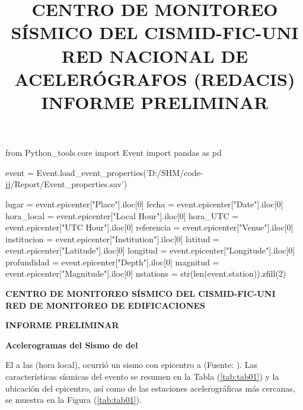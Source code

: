 \documentclass[11pt, a4paper]{report}
\title{CENTRO DE MONITOREO SÍSMICO DEL CISMID-FIC-UNI \\
RED NACIONAL DE ACELERÓGRAFOS (REDACIS)\\
INFORME PRELIMINAR\\
}
\begin{document}




\begin{pycode}
from Python_tools.core import Event
import pandas as pd

event = Event.load_event_properties('D:/SHM/code-jj/Report/Event_properties.sav')

lugar = event.epicenter["Place"].iloc[0]
fecha = event.epicenter["Date"].iloc[0]
hora_local = event.epicenter["Local Hour"].iloc[0]
hora_UTC = event.epicenter["UTC Hour"].iloc[0]
referencia = event.epicenter["Venue"].iloc[0]
institucion = event.epicenter["Institution"].iloc[0]
latitud = event.epicenter["Latitude"].iloc[0]
longitud = event.epicenter["Longitude"].iloc[0]
profundidad =  event.epicenter["Depth"].iloc[0]
magnitud = event.epicenter["Magnitude"].iloc[0]
nstations = str(len(event.station)).zfill(2)

\end{pycode}

\begin{center}
\centering 
\textbf{CENTRO DE MONITOREO SÍSMICO DEL CISMID-FIC-UNI \\
RED DE MONITOREO DE EDIFICACIONES}
\vspace{0.3cm}

\textbf{INFORME PRELIMINAR}
\vspace{0.3cm}

\textbf{Acelerogramas del Sismo de  del }
\vspace{0.25cm}
\end{center}

El  a las  (hora local), ocurrió un sismo con epicentro a  (Fuente: ). Las características sísmicas del evento 
se resumen en la Tabla (\ref{tab:tab01}) y la ubicación del epicentro, así como de las estaciones 
acelerográficas más cercanas, se muestra en la Figura (\ref{tab:tab01}). \\
\end{document}
